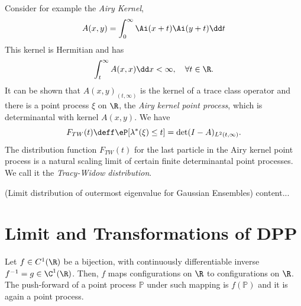 {

Consider for example the \textit{Airy Kernel},
\begin{equation}
	A(x, y) = \int_{0}^{\infty} \Ai(x+t) \Ai(y + t) \dd t
\end{equation}
This kernel is Hermitian and has 
\begin{equation}
	\int_{t}^{\infty} A(x,x) \dd x < \infty, \quad \forall t \in \R.
\end{equation}
It can be shown that $A(x,y)_{(t,\infty)}$ is the kernel of a trace class operator and there is a point process $\xi$ on $\R$, the \textit{Airy kernel point process}, which is determinantal with kernel $A(x,y)$. We have
\begin{equation}
	F_{TW}(t) \deff \eP[\lambda^*(\xi) \leq t] = \det(I - A)_{L^2(t, \infty)}.
\end{equation} 
The distribution function $F_{TW}(t)$ for the last particle in the Airy kernel point process is a natural scaling limit of certain finite determinantal point processes. We call it the \textit{Tracy-Widow distribution}.

\begin{exemplo} (Limit distribution of outermost eigenvalue for Gaussian Ensembles)
	content...
\end{exemplo}
}

\section{Limit and Transformations of DPP}

Let $f \in C^1(\R)$ be a bijection, with continuously differentiable inverse $f^{-1} = g \in \C^1(\R)$. Then, $f$ maps configurations on $\R$ to configurations on $\R$. The push-forward of a point process $\mathbb{P}$ under such mapping is $f(\mathbb{P})$ and it is again a point process.

